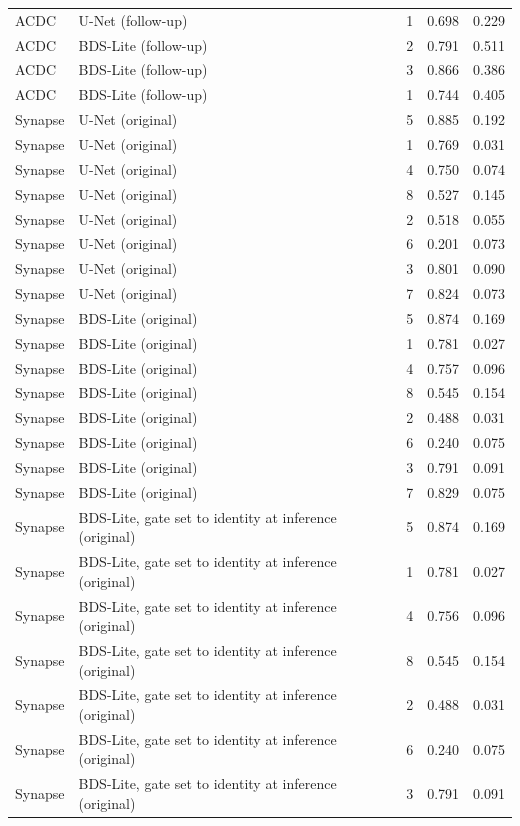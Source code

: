 \begin{longtable}{lllll}
ACDC & U-Net (follow-up) & 1 & 0.698 & 0.229 \\
ACDC & BDS-Lite (follow-up) & 2 & 0.791 & 0.511 \\
ACDC & BDS-Lite (follow-up) & 3 & 0.866 & 0.386 \\
ACDC & BDS-Lite (follow-up) & 1 & 0.744 & 0.405 \\
Synapse & U-Net (original) & 5 & 0.885 & 0.192 \\
Synapse & U-Net (original) & 1 & 0.769 & 0.031 \\
Synapse & U-Net (original) & 4 & 0.750 & 0.074 \\
Synapse & U-Net (original) & 8 & 0.527 & 0.145 \\
Synapse & U-Net (original) & 2 & 0.518 & 0.055 \\
Synapse & U-Net (original) & 6 & 0.201 & 0.073 \\
Synapse & U-Net (original) & 3 & 0.801 & 0.090 \\
Synapse & U-Net (original) & 7 & 0.824 & 0.073 \\
Synapse & BDS-Lite (original) & 5 & 0.874 & 0.169 \\
Synapse & BDS-Lite (original) & 1 & 0.781 & 0.027 \\
Synapse & BDS-Lite (original) & 4 & 0.757 & 0.096 \\
Synapse & BDS-Lite (original) & 8 & 0.545 & 0.154 \\
Synapse & BDS-Lite (original) & 2 & 0.488 & 0.031 \\
Synapse & BDS-Lite (original) & 6 & 0.240 & 0.075 \\
Synapse & BDS-Lite (original) & 3 & 0.791 & 0.091 \\
Synapse & BDS-Lite (original) & 7 & 0.829 & 0.075 \\
Synapse & BDS-Lite, gate set to identity at inference (original) & 5 & 0.874 & 0.169 \\
Synapse & BDS-Lite, gate set to identity at inference (original) & 1 & 0.781 & 0.027 \\
Synapse & BDS-Lite, gate set to identity at inference (original) & 4 & 0.756 & 0.096 \\
Synapse & BDS-Lite, gate set to identity at inference (original) & 8 & 0.545 & 0.154 \\
Synapse & BDS-Lite, gate set to identity at inference (original) & 2 & 0.488 & 0.031 \\
Synapse & BDS-Lite, gate set to identity at inference (original) & 6 & 0.240 & 0.075 \\
Synapse & BDS-Lite, gate set to identity at inference (original) & 3 & 0.791 & 0.091 \\

\end{longtable}
